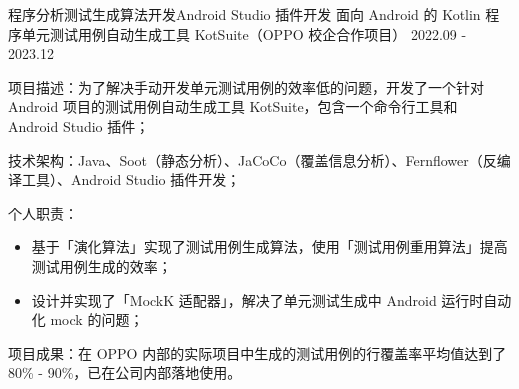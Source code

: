 \begin{cventries}
  \cventry
    {程序分析{\enskip\cdotp\enskip}测试生成算法开发{\enskip\cdotp\enskip}Android Studio 插件开发} %
    {面向 Android 的 Kotlin 程序单元测试用例自动生成工具 KotSuite（OPPO 校企合作项目）} %
    {2022.09 - 2023.12} %
    {} %
    {
      \begin{cvitems} %
        \item {项目描述：为了解决手动开发单元测试用例的效率低的问题，开发了一个针对 Android 项目的测试用例自动生成工具 KotSuite，包含一个命令行工具和 Android Studio 插件；}
        \item {技术架构：Java、Soot（静态分析）、JaCoCo（覆盖信息分析）、Fernflower（反编译工具）、Android Studio 插件开发；}
        \item {个人职责：}
          \begin{itemize}
            \item {基于「演化算法」实现了测试用例生成算法，使用「测试用例重用算法」提高测试用例生成的效率；}
            \item {设计并实现了「MockK 适配器」，解决了单元测试生成中 Android 运行时自动化 mock 的问题；}
          \end{itemize}
        \item {项目成果：在 OPPO 内部的实际项目中生成的测试用例的行覆盖率平均值达到了 80\% - 90\%，已在公司内部落地使用。}
      \end{cvitems}
    }


\end{cventries}

